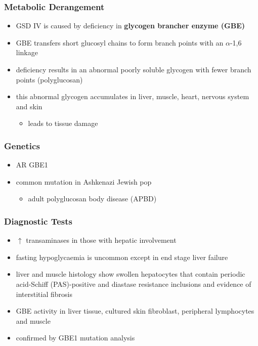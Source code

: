 \documentclass[12pt]{scrartcl}
\begin{document}
\subsubsection{Metabolic Derangement}
\label{sec:org5e5c782}
\begin{itemize}
\item GSD IV is caused by deficiency in \textbf{glycogen brancher enzyme (GBE)}
\item GBE transfers short glucosyl chains to form branch points with an
\(\alpha\)-1,6 linkage
\item deficiency results in an abnormal poorly soluble glycogen with fewer branch points (polyglucosan)
\item this abnormal glycogen accumulates in liver, muscle, heart, nervous system and skin
\begin{itemize}
\item leads to tissue damage
\end{itemize}
\end{itemize}

\subsubsection{Genetics}
\label{sec:org6c013eb}
\begin{itemize}
\item AR GBE1
\item common mutation in Ashkenazi Jewish pop
\begin{itemize}
\item adult polyglucosan body disease (APBD)
\end{itemize}
\end{itemize}

\subsubsection{Diagnostic Tests}
\label{sec:org9325628}

\begin{itemize}
\item \(\uparrow\) transaminases in those with hepatic involvement
\item fasting hypoglycaemia is uncommon except in end stage liver failure
\item liver and muscle histology show swollen hepatocytes that contain
periodic acid-Schiff (PAS)-positive and diastase resistance
inclusions and evidence of interstitial fibrosis
\item GBE activity in liver tissue, cultured skin fibroblast, peripheral
lymphocytes and muscle
\item confirmed by GBE1 mutation analysis
\end{itemize}
\end{document}
